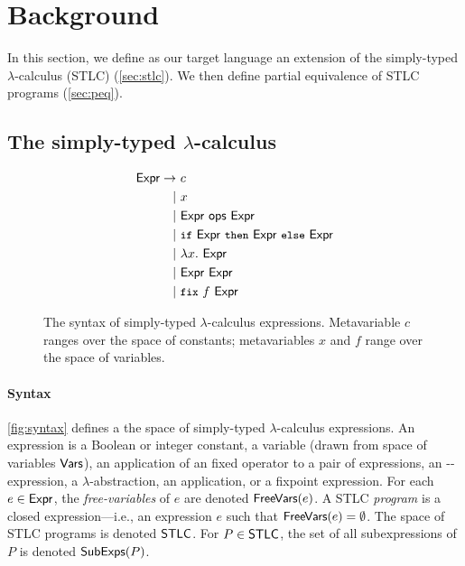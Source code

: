 \section{Background}
\label{sec:background}
%
In this section, we define as our target language an extension of the
simply-typed $\lambda$-calculus (STLC) (\autoref{sec:stlc}).
%
We then define partial equivalence of STLC programs
(\autoref{sec:peq}).

\subsection{The simply-typed $\lambda$-calculus}
\label{sec:stlc}
\begin{figure}[t]
  \begin{align*}
    \expr \rightarrow &\ c \\
    | &\ x \\
    | &\ \expr\ \ops\ \expr \\
    | &\ \cc{if}\ \expr\ \cc{then}\ \expr\ \cc{else}\ \expr \\
    | &\ \lambda x.\ \expr \\
    | &\ \expr\ \expr \\
    | &\ \cc{fix}\ f\ \expr
  \end{align*}
  \caption{The syntax of simply-typed $\lambda$-calculus expressions.
    Metavariable $c$ ranges over the space of constants; %
    metavariables $x$ and $f$ range over the space of variables.}
  \label{fig:syntax}
\end{figure}

\paragraph{Syntax} \autoref{fig:syntax} defines a the space of
simply-typed $\lambda$-calculus expressions.
%
An expression is a Boolean or integer constant, %
a variable (drawn from space of variables $\mathsf{Vars}$), %
an application of an fixed operator to a pair of expressions, %
an -- expression, %
a $\lambda$-abstraction, %
an application, or %
a fixpoint expression.
%
For each $e \in \mathsf{Expr}$, the \emph{free-variables} of $e$ are denoted
$\mathsf{FreeVars}(e)$.
%
A STLC \emph{program} is a closed expression---i.e., an expression $e$
such that $\mathsf{FreeVars}(e) = \emptyset$.
%
The space of STLC programs is denoted $\mathsf{STLC}$.
%
For $P \in \mathsf{STLC}$, the set of all subexpressions of $P$ is denoted
$\mathsf{SubExps}(P)$.

